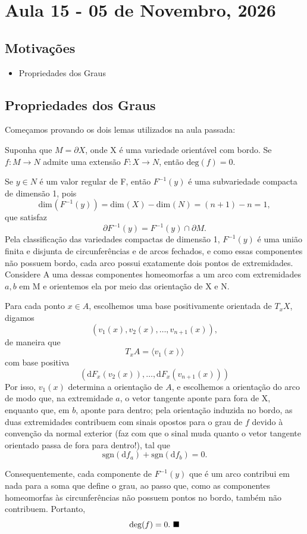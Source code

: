 \documentclass[../differential_topology.tex]{subfiles}
\begin{document}
\section{Aula 15 - 05 de Novembro, 2026}
\subsection{Motivações}
\begin{itemize}
	\item Propriedades dos Graus
\end{itemize}
\subsection{Propriedades dos Graus}
Começamos provando os dois lemas utilizados na aula passada:
\begin{lemma*}
	Suponha que \(M = \partial X\), onde X é uma variedade orientável com bordo. Se \(f:M\rightarrow N\) admite uma extensão \(F:X\rightarrow N\), então \(\mathrm{deg}(f) = 0\).
\end{lemma*}
\begin{proof*}
	Se \(y\in N\) é um valor regular de F, então \(F^{-1}(y)\) é uma subvariedade compacta de dimensão 1, pois
	\[
		\mathrm{dim}_{}(F^{-1}(y)) = \mathrm{dim}_{}(X) - \mathrm{dim}_{}(N) = (n+1) - n = 1,
	\]
	que satisfaz
	\[
		\partial F^{-1}(y) = F^{-1}(y)\cap \partial M.
	\]
	Pela classificação das variedades compactas de dimensão 1, \(F^{-1}(y)\) é uma união finita e disjunta de circunferências e de arcos fechados, e como essas componentes não possuem bordo, cada arco possui exatamente dois pontos de extremidades. Considere A uma dessas componentes homeomorfas a um arco com extremidades \(a, b\) em M e orientemos ela por meio das orientação de X e N.

	Para cada ponto \(x\in A\), escolhemos uma base positivamente orientada de \(T_{x}X\), digamos
	\[
		(v_1(x), v_2(x), \dotsc , v_{n+1}(x)),
	\]
	de maneira que
	\[
		T_{x}A = \langle v_1(x) \rangle
	\]
	com base positiva
	\[
		\left(\mathrm{d}F_x(v_2(x)), \dotsc , \mathrm{d}F_{x}(v_{n+1}(x))\right)
	\]
	Por isso, \(v_1(x)\) determina a orientação de \(A\), e escolhemos a orientação do arco de modo que, na extremidade \(a\), o vetor tangente aponte para fora de X, enquanto que, em \(b\), aponte para dentro; pela orientação induzida no bordo, as duas extremidades contribuem com sinais opostos para o grau de \(f\) devido à convenção da normal exterior (faz com que o sinal muda quanto o vetor tangente orientado passa de fora para dentro!), tal que
	\[
		\mathrm{sgn}(\mathrm{d}f_{a}) + \mathrm{sgn}(\mathrm{d}f_{b}) = 0.
	\]

	Consequentemente, cada componente de \(F^{-1}(y)\) que é um arco contribui em nada para a soma que define o grau, ao passo que, como as componentes homeomorfas às circunferências não possuem pontos no bordo, também não contribuem. Portanto,
	\[
		\mathrm{deg}(f) = 0. \text{ $\blacksquare$}
	\]
\end{proof*}
\end{document}
